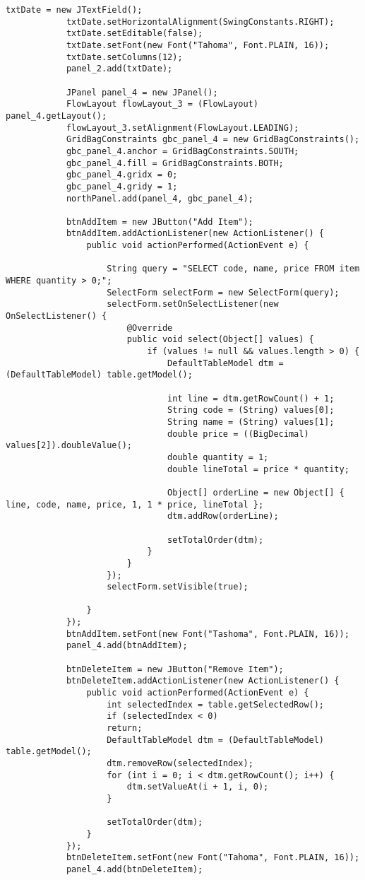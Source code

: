 \begin{lstlisting}[style=JavaStyle]
			txtDate = new JTextField();
			txtDate.setHorizontalAlignment(SwingConstants.RIGHT);
			txtDate.setEditable(false);
			txtDate.setFont(new Font("Tahoma", Font.PLAIN, 16));
			txtDate.setColumns(12);
			panel_2.add(txtDate);
			
			JPanel panel_4 = new JPanel();
			FlowLayout flowLayout_3 = (FlowLayout) panel_4.getLayout();
			flowLayout_3.setAlignment(FlowLayout.LEADING);
			GridBagConstraints gbc_panel_4 = new GridBagConstraints();
			gbc_panel_4.anchor = GridBagConstraints.SOUTH;
			gbc_panel_4.fill = GridBagConstraints.BOTH;
			gbc_panel_4.gridx = 0;
			gbc_panel_4.gridy = 1;
			northPanel.add(panel_4, gbc_panel_4);
			
			btnAddItem = new JButton("Add Item");
			btnAddItem.addActionListener(new ActionListener() {
				public void actionPerformed(ActionEvent e) {
					
					String query = "SELECT code, name, price FROM item WHERE quantity > 0;";
					SelectForm selectForm = new SelectForm(query);
					selectForm.setOnSelectListener(new OnSelectListener() {
						@Override
						public void select(Object[] values) {
							if (values != null && values.length > 0) {
								DefaultTableModel dtm = (DefaultTableModel) table.getModel();
								
								int line = dtm.getRowCount() + 1;
								String code = (String) values[0];
								String name = (String) values[1];
								double price = ((BigDecimal) values[2]).doubleValue();
								double quantity = 1;
								double lineTotal = price * quantity;
								
								Object[] orderLine = new Object[] { line, code, name, price, 1, 1 * price, lineTotal };
								dtm.addRow(orderLine);
								
								setTotalOrder(dtm);
							}
						}
					});
					selectForm.setVisible(true);
					
				}
			});
			btnAddItem.setFont(new Font("Tashoma", Font.PLAIN, 16));
			panel_4.add(btnAddItem);
			
			btnDeleteItem = new JButton("Remove Item");
			btnDeleteItem.addActionListener(new ActionListener() {
				public void actionPerformed(ActionEvent e) {
					int selectedIndex = table.getSelectedRow();
					if (selectedIndex < 0)
					return;
					DefaultTableModel dtm = (DefaultTableModel) table.getModel();
					dtm.removeRow(selectedIndex);
					for (int i = 0; i < dtm.getRowCount(); i++) {
						dtm.setValueAt(i + 1, i, 0);
					}
					
					setTotalOrder(dtm);
				}
			});
			btnDeleteItem.setFont(new Font("Tahoma", Font.PLAIN, 16));
			panel_4.add(btnDeleteItem);
			

\end{lstlisting}
